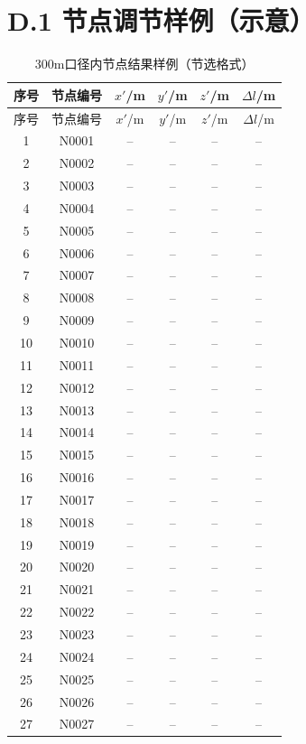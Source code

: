 \section*{D.1 节点调节样例（示意）}
\small
\begin{longtable}{cccccc}
\caption{300m口径内节点结果样例（节选格式）}\\
\toprule
序号 & 节点编号 & $x'$/m & $y'$/m & $z'$/m & $\Delta l$/m\\
\midrule
\endfirsthead
\toprule
序号 & 节点编号 & $x'$/m & $y'$/m & $z'$/m & $\Delta l$/m\\
\midrule
\endhead
1 & N0001 & -- & -- & -- & -- \\
2 & N0002 & -- & -- & -- & -- \\
3 & N0003 & -- & -- & -- & -- \\
4 & N0004 & -- & -- & -- & -- \\
5 & N0005 & -- & -- & -- & -- \\
6 & N0006 & -- & -- & -- & -- \\
7 & N0007 & -- & -- & -- & -- \\
8 & N0008 & -- & -- & -- & -- \\
9 & N0009 & -- & -- & -- & -- \\
10 & N0010 & -- & -- & -- & -- \\
11 & N0011 & -- & -- & -- & -- \\
12 & N0012 & -- & -- & -- & -- \\
13 & N0013 & -- & -- & -- & -- \\
14 & N0014 & -- & -- & -- & -- \\
15 & N0015 & -- & -- & -- & -- \\
16 & N0016 & -- & -- & -- & -- \\
17 & N0017 & -- & -- & -- & -- \\
18 & N0018 & -- & -- & -- & -- \\
19 & N0019 & -- & -- & -- & -- \\
20 & N0020 & -- & -- & -- & -- \\
21 & N0021 & -- & -- & -- & -- \\
22 & N0022 & -- & -- & -- & -- \\
23 & N0023 & -- & -- & -- & -- \\
24 & N0024 & -- & -- & -- & -- \\
25 & N0025 & -- & -- & -- & -- \\
26 & N0026 & -- & -- & -- & -- \\
27 & N0027 & -- & -- & -- & -- \\

\end{longtable}
